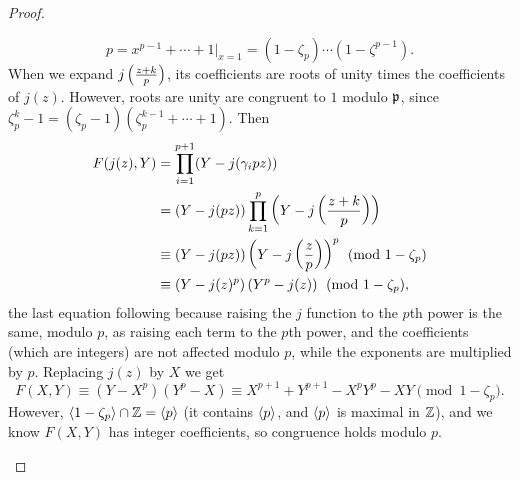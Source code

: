 \begin{proof}
\begin{enumerate}
\[
p=x^{p-1}+\cdots +1|_{x=1}=(1-\zeta_p)\cdots (1-\zeta^{p-1}).
\]
When we expand $j\left( {\frac{z+k}{p}} \right)$, its coefficients are roots of unity times the coefficients of $j(z)$. However, roots are unity are congruent to $1$ modulo $\mathfrak{p}$, since $\zeta_p^k-1=(\zeta_p-1)(\zeta_p^{k-1}+\cdots +1)$. Then
\begin{align*}
F(j(z),Y)%
&=\prod_{i=1}^{p+1}(Y-j(\ga_ipz))\\
&=(Y-j(pz))\prod_{k=1}^{p}\pa{Y-j\pf{z+k}{p}}\\
&\equiv (Y-j(pz))\pa{Y-j\pa{\frac zp}}^p\pmod{1-\zeta_p} \\
&\equiv (Y-j(z)^p)\pa{Y^p-j(z)}\pmod{1-\zeta_p},
\end{align*}
the last equation following because raising the $j$ function to the $p$th power is the same, modulo $p$, as raising each term to the $p$th power, and the coefficients (which are integers) are not affected modulo $p$, while the exponents are multiplied by $p$. 
Replacing $j(z)$ by $X$ we get
\[F(X,Y)\equiv (Y-X^p)(Y^p-X)\equiv X^{p+1}+Y^{p+1}-X^pY^p-XY \pmod{1-\zeta_p}.\]
However, $\left\langle {1-\zeta_p}\right\rangle\cap \mathbb{Z}=\left\langle {p}\right\rangle$ (it contains $\left\langle {p}\right\rangle$, and $\left\langle {p}\right\rangle$ is maximal in $\mathbb{Z}$), and we know $F(X,Y)$ has integer coefficients, so congruence holds modulo $p$.
\end{enumerate}
\end{proof}
